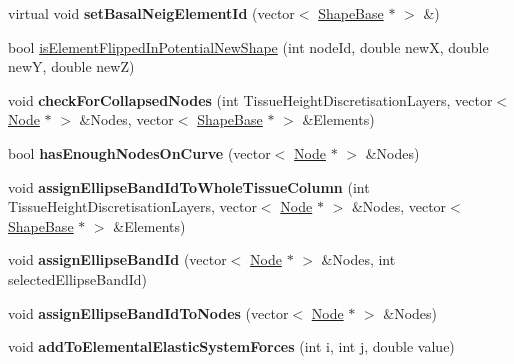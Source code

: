 \begin{DoxyCompactItemize}
\item 
\hypertarget{classShapeBase_a67ab37424a6fef45abab394b74bca134}{}virtual void {\bfseries set\+Basal\+Neig\+Element\+Id} (vector$<$ \hyperlink{classShapeBase}{Shape\+Base} $\ast$ $>$ \&)\label{classShapeBase_a67ab37424a6fef45abab394b74bca134}

\item 
bool \hyperlink{classShapeBase_a8763ab46f90adb819ec776a5829573c5}{is\+Element\+Flipped\+In\+Potential\+New\+Shape} (int node\+Id, double new\+X, double new\+Y, double new\+Z)
\item 
\hypertarget{classShapeBase_a966b9275bb7d1cc73f5253a3087436fb}{}void {\bfseries check\+For\+Collapsed\+Nodes} (int Tissue\+Height\+Discretisation\+Layers, vector$<$ \hyperlink{classNode}{Node} $\ast$ $>$ \&Nodes, vector$<$ \hyperlink{classShapeBase}{Shape\+Base} $\ast$ $>$ \&Elements)\label{classShapeBase_a966b9275bb7d1cc73f5253a3087436fb}

\item 
\hypertarget{classShapeBase_abdb4b79809dfe5324af6cf590e12ca27}{}bool {\bfseries has\+Enough\+Nodes\+On\+Curve} (vector$<$ \hyperlink{classNode}{Node} $\ast$ $>$ \&Nodes)\label{classShapeBase_abdb4b79809dfe5324af6cf590e12ca27}

\item 
\hypertarget{classShapeBase_ab4411992f8433341d3087ed53581c0bc}{}void {\bfseries assign\+Ellipse\+Band\+Id\+To\+Whole\+Tissue\+Column} (int Tissue\+Height\+Discretisation\+Layers, vector$<$ \hyperlink{classNode}{Node} $\ast$ $>$ \&Nodes, vector$<$ \hyperlink{classShapeBase}{Shape\+Base} $\ast$ $>$ \&Elements)\label{classShapeBase_ab4411992f8433341d3087ed53581c0bc}

\item 
\hypertarget{classShapeBase_ace0432379342fb6664f67c467871e698}{}void {\bfseries assign\+Ellipse\+Band\+Id} (vector$<$ \hyperlink{classNode}{Node} $\ast$ $>$ \&Nodes, int selected\+Ellipse\+Band\+Id)\label{classShapeBase_ace0432379342fb6664f67c467871e698}

\item 
\hypertarget{classShapeBase_a4ffa720225ad34e81371fa82d979f261}{}void {\bfseries assign\+Ellipse\+Band\+Id\+To\+Nodes} (vector$<$ \hyperlink{classNode}{Node} $\ast$ $>$ \&Nodes)\label{classShapeBase_a4ffa720225ad34e81371fa82d979f261}

\item 
\hypertarget{classShapeBase_a677fceb50ab5626dbc9c4f8079829d59}{}void {\bfseries add\+To\+Elemental\+Elastic\+System\+Forces} (int i, int j, double value)\label{classShapeBase_a677fceb50ab5626dbc9c4f8079829d59}


\end{DoxyCompactItemize}
